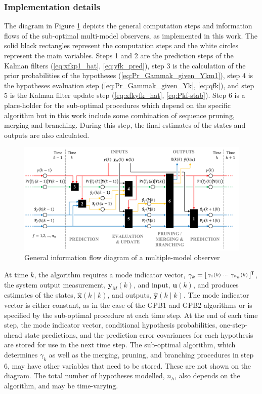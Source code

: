 \subsubsection{Implementation details} \label{sec:implementation}

The diagram in Figure \ref{fig:mkf-infoflow} depicts the general computation steps and information flows of the sub-optimal multi-model observers, as implemented in this work. The solid black rectangles represent the computation steps and the white circles represent the main variables. Steps 1 and 2 are the prediction steps of the Kalman filters (\ref{eq:xfkp1_hat}, \ref{eq:yfk_pred}), step 3 is the calculation of the prior probabilities of the hypotheses (\ref{eq:Pr_Gammak_given_Ykm1}), step 4 is the hypotheses evaluation step (\ref{eq:Pr_Gammak_given_Yk}, \ref{eq:qfk}), and step 5 is the Kalman filter update step (\ref{eq:xfkyfk_hat}, \ref{eq:Pkf-stab}). Step 6 is a place-holder for the sub-optimal procedures which depend on the specific algorithm but in this work include some combination of sequence pruning, merging and branching. During this step, the final estimates of the states and outputs are also calculated.

\begin{figure}[ht]
	\centering
	\includegraphics[width=15.5cm]{images/mkf_infoflow.pdf}
	\caption{General information flow diagram of a multiple-model observer}
	\label{fig:mkf-infoflow}
\end{figure}

At time $k$, the algorithm requires a mode indicator vector, $\gamma_k=\begin{bsmallmatrix} \gamma_1(k) & \cdots & \gamma_{n_h}(k) \end{bsmallmatrix}^\intercal$, the system output measurement, $\mathbf{y}_M(k)$, and input, $\mathbf{u}(k)$, and produces estimates of the states, $\hat{\mathbf{x}}(k \mid k)$, and outputs, $\hat{\mathbf{y}}(k \mid k)$. The mode indicator vector is either constant, as in the case of the \gls{GPB1} and \gls{GPB2} algorithms or is specified by the sub-optimal procedure at each time step. At the end of each time step, the mode indicator vector, conditional hypothesis probabilities, one-step-ahead state predictions, and the prediction error covariances for each hypothesis are stored for use in the next time step. The sub-optimal algorithm, which determines $\gamma_k$ as well as the merging, pruning, and branching procedures in step 6, may have other variables that need to be stored. These are not shown on the diagram. The total number of hypotheses modelled, $n_h$, also depends on the algorithm, and may be time-varying.

